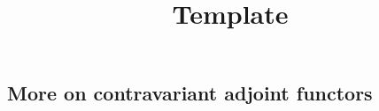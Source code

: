 \documentclass[../../solutions]{subfiles}
\title{Template}
\author{}
\begin{document}
\maketitle

\subsection{More on contravariant adjoint functors}
\label{ssec:contravariant-extension}
\end{document}
